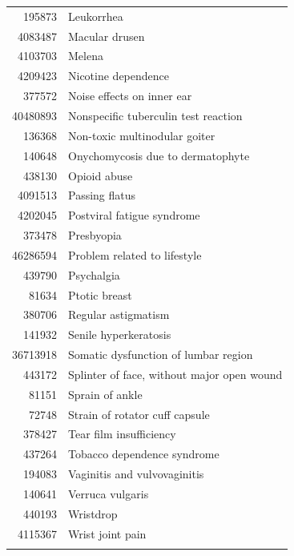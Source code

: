 \documentclass[]{book}
\begin{document}
\begin{longtable}[]{@{}rl@{}}
195873 & Leukorrhea\tabularnewline
4083487 & Macular drusen\tabularnewline
4103703 & Melena\tabularnewline
4209423 & Nicotine dependence\tabularnewline
377572 & Noise effects on inner ear\tabularnewline
40480893 & Nonspecific tuberculin test reaction\tabularnewline
136368 & Non-toxic multinodular goiter\tabularnewline
140648 & Onychomycosis due to dermatophyte\tabularnewline
438130 & Opioid abuse\tabularnewline
4091513 & Passing flatus\tabularnewline
4202045 & Postviral fatigue syndrome\tabularnewline
373478 & Presbyopia\tabularnewline
46286594 & Problem related to lifestyle\tabularnewline
439790 & Psychalgia\tabularnewline
81634 & Ptotic breast\tabularnewline
380706 & Regular astigmatism\tabularnewline
141932 & Senile hyperkeratosis\tabularnewline
36713918 & Somatic dysfunction of lumbar region\tabularnewline
443172 & Splinter of face, without major open wound\tabularnewline
81151 & Sprain of ankle\tabularnewline
72748 & Strain of rotator cuff capsule\tabularnewline
378427 & Tear film insufficiency\tabularnewline
437264 & Tobacco dependence syndrome\tabularnewline
194083 & Vaginitis and vulvovaginitis\tabularnewline
140641 & Verruca vulgaris\tabularnewline
440193 & Wristdrop\tabularnewline
4115367 & Wrist joint pain\tabularnewline
&\tabularnewline
\bottomrule
\end{longtable}


\end{document}

